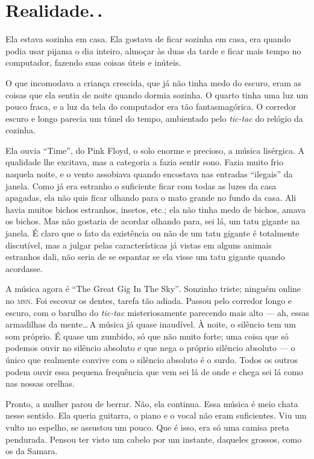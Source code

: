 \chapter{Realidade.\,.}

Ela estava sozinha em casa. Ela gostava de ficar sozinha em casa, era quando podia usar pijama o dia inteiro, almoçar às duas da tarde e ficar mais tempo no computador, fazendo suas coisas úteis e inúteis.

O que incomodava a criança crescida, que já não tinha medo do escuro, eram as coisas que ela sentia de noite quando dormia sozinha. O quarto tinha uma luz um pouco fraca, e a luz da tela do computador era tão fantasmagórica. O corredor escuro e longo parecia um túnel do tempo, ambientado pelo \emph{tic-tac} do relógio da cozinha.

Ela ouvia ``Time'', do Pink Floyd, o solo enorme e precioso, a música lisérgica. A qualidade lhe excitava, mas a categoria a fazia sentir sono. Fazia muito frio naquela noite, e o vento assobiava quando encostava nas entradas ``ilegais'' da janela. Como já era estranho o suficiente ficar com todas as luzes da casa apagadas, ela não quis ficar olhando para o mato grande no fundo da casa. Ali havia muitos bichos estranhos, insetos, etc.; ela não tinha medo de bichos, amava os bichos. Mas não gostaria de acordar olhando para, sei lá, um tatu gigante na janela. É claro que o fato da existência ou não de um tatu gigante é totalmente discutível, mas a julgar pelas características já vistas em alguns animais estranhos dali, não seria de se espantar se ela visse um tatu gigante quando acordasse.

A música agora é \foreignlanguage{english}{``The Great Gig In The Sky''}. Sonzinho triste; ninguém online no \textsc{msn}. Foi escovar os dentes, tarefa tão adiada. Passou pelo corredor longo e escuro, com o barulho do \emph{tic-tac} misteriosamente parecendo mais alto --- ah, essas armadilhas da mente\ldots\,A música já quase inaudível. À noite, o silêncio tem um som próprio. É quase um zumbido, só que não muito forte; uma coisa que só podemos ouvir no silêncio absoluto e que nega o próprio silêncio absoluto --- o único que realmente convive com o silêncio absoluto é o surdo. Todos os outros podem ouvir essa pequena frequência que vem sei lá de onde e chega sei lá como nas nossas orelhas.

Pronto, a mulher parou de berrar. Não, ela continua. Essa música é meio chata nesse sentido. Ela queria guitarra, o piano e o vocal não eram suficientes. Viu um vulto no espelho, se assustou um pouco. Que é isso, era só uma camisa preta pendurada. Pensou ter visto um cabelo por um instante, daqueles grossos, como os da Samara.

